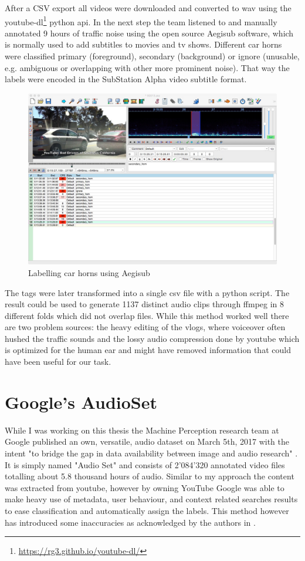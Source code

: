 After a CSV export all videos were downloaded and converted to wav using the youtube-dl\footnote{\url{https://rg3.github.io/youtube-dl/}} python api. In the next step the team listened to and manually annotated 9 hours of traffic noise using the open source Aegisub software, which is normally used to add subtitles to movies and tv shows. Different car horns were classified primary (foreground), secondary (background) or ignore (unusable, e.g. ambiguous or overlapping with other more prominent noise). That way the labels were encoded in the SubStation Alpha video subtitle format.


\begin{figure}[h]
    \centering
	\includegraphics[width=.85\textwidth]{./images/illustrations/subt}
    \caption{Labelling car horns using Aegisub}
    \label{fig:subt}
\end{figure}



 The tags were later transformed into a single csv file with a python script. The result could be used to generate 1137 distinct audio clips through ffmpeg in 8 different folds which did not overlap files. While this method worked well there are two problem sources: the heavy editing of the vlogs, where voiceover often hushed the traffic sounds and the lossy audio compression done by youtube which is optimized for the human ear and might have removed information that could have been useful for our task.


\section{Google's AudioSet}
\label{google-audioset}

While I was working on this thesis the Machine Perception research team at Google published an own, versatile, audio dataset on March 5th, 2017 with the intent "to bridge the gap in data availability between image and audio research" \cite{45857}. It is simply named "Audio Set" and consists of 2'084'320 annotated video files totalling about 5.8 thousand hours of audio. Similar to my approach the content was extracted from youtube, however by owning YouTube Google was able to make heavy use of metadata, user behaviour, and context related searches results to ease classification and automatically assign the labels. This method however has introduced some inaccuracies as acknowledged by the authors in \cite{45611}.

